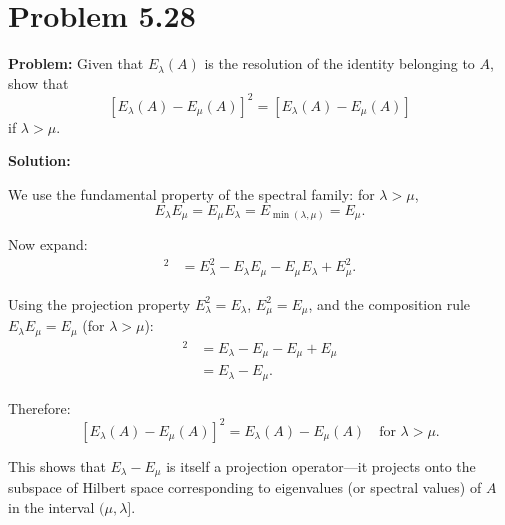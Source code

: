 \documentclass[12pt]{article}
\begin{document}
\section*{Problem 5.28}

\textbf{Problem:} Given that $E_\lambda(A)$ is the resolution of the identity belonging to $A$, show that
\[
[E_\lambda(A) - E_\mu(A)]^2 = [E_\lambda(A) - E_\mu(A)]
\]
if $\lambda > \mu$.

\bigskip
\textbf{Solution:}

We use the fundamental property of the spectral family: for $\lambda > \mu$,
\[
E_\lambda E_\mu = E_\mu E_\lambda = E_{\min(\lambda,\mu)} = E_\mu.
\]

Now expand:
\begin{align}
[E_\lambda - E_\mu]^2 &= E_\lambda^2 - E_\lambda E_\mu - E_\mu E_\lambda + E_\mu^2.
\end{align}

Using the projection property $E_\lambda^2 = E_\lambda$, $E_\mu^2 = E_\mu$, and the composition rule $E_\lambda E_\mu = E_\mu$ (for $\lambda > \mu$):
\begin{align}
[E_\lambda - E_\mu]^2 &= E_\lambda - E_\mu - E_\mu + E_\mu \\
&= E_\lambda - E_\mu.
\end{align}

Therefore:
\[
\boxed{[E_\lambda(A) - E_\mu(A)]^2 = E_\lambda(A) - E_\mu(A) \quad \text{for } \lambda > \mu.}
\]

This shows that $E_\lambda - E_\mu$ is itself a projection operator---it projects onto the subspace of Hilbert space corresponding to eigenvalues (or spectral values) of $A$ in the interval $(\mu, \lambda]$.
\end{document}
